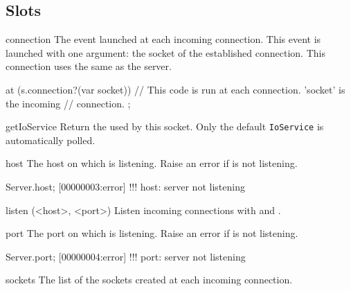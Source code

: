 \subsection{Slots}
\begin{urbiscriptapi}
\item[connection]
  The event launched at each incoming connection. This event is
  launched with one argument: the socket of the established connection. This
  connection uses the same  as the server.
\begin{urbiscript}
at (s.connection?(var socket))
{
  // This code is run at each connection. 'socket' is the incoming
  // connection.
};
\end{urbiscript}


\item[getIoService]
  Return the  used by this socket. Only the default
  \lstinline|IoService| is automatically polled.


\item[host]
  The host on which \this is listening. Raise an error if
  \this is not listening.
\begin{urbiscript}
Server.host;
[00000003:error] !!! host: server not listening
\end{urbiscript}


\item[listen](<host>, <port>)%
  Listen incoming connections with  and .


\item[port]
  The port on which \this is listening. Raise an error if
  \this is not listening.
\begin{urbiscript}
Server.port;
[00000004:error] !!! port: server not listening
\end{urbiscript}


\item[sockets]
  The list of the sockets created at each incoming connection.
\end{urbiscriptapi}

